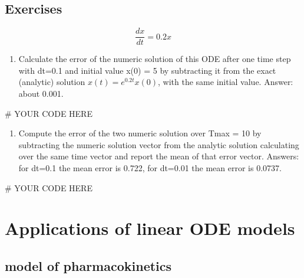\documentclass[
  letterpaper,
  DIV=11,
  numbers=noendperiod]{scrreprt}
\newenvironment{Shaded}{\begin{snugshade}}{\end{snugshade}}
\newcommand{\CommentTok}[1]{\textcolor[rgb]{0.37,0.37,0.37}{#1}}
\providecommand{\tightlist}{%
  \setlength{\itemsep}{0pt}\setlength{\parskip}{0pt}}\usepackage{longtable,booktabs,array}
\begin{document}
\hypertarget{exercises-26}{%
\subsection{Exercises}\label{exercises-26}}

\[
\frac{dx}{dt} =  0.2 x 
\]

\begin{enumerate}
\def\labelenumi{\arabic{enumi}.}
\tightlist
\item
  Calculate the error of the numeric solution of this ODE after one time
  step with dt=0.1 and initial value x(0) = 5 by subtracting it from the
  exact (analytic) solution \(x(t) = e^{0.2t}x(0)\), with the same
  initial value. Answer: about 0.001.
\end{enumerate}

\begin{Shaded}
\begin{Highlighting}[]
\CommentTok{\# YOUR CODE HERE}
\end{Highlighting}
\end{Shaded}

\begin{enumerate}
\def\labelenumi{\arabic{enumi}.}
\setcounter{enumi}{1}
\tightlist
\item
  Compute the error of the two numeric solution over Tmax = 10 by
  subtracting the numeric solution vector from the analytic solution
  calculating over the same time vector and report the mean of that
  error vector. Answers: for dt=0.1 the mean error is 0.722, for dt=0.01
  the mean error is 0.0737.
\end{enumerate}

\begin{Shaded}
\begin{Highlighting}[]
\CommentTok{\# YOUR CODE HERE}
\end{Highlighting}
\end{Shaded}

\hypertarget{applications-of-linear-ode-models}{%
\section{Applications of linear ODE
models}\label{applications-of-linear-ode-models}}

\label{sec:bio15}

\hypertarget{model-of-pharmacokinetics}{%
\subsection{model of pharmacokinetics}\label{model-of-pharmacokinetics}}
\end{document}

